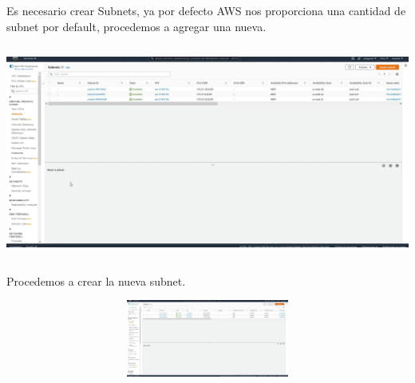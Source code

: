 \documentclass{article} %
\begin{document}
\noindent 

\noindent 

\noindent 

\noindent Es necesario crear Subnets, ya por defecto AWS nos proporciona una cantidad de subnet por default, procedemos a agregar una nueva. 

\noindent 

\noindent \includegraphics*[width=6.43in, height=2.78in, trim=0.02in 0.16in 0.08in 0.13in]{image4}

\noindent 

\noindent 

\noindent 

\noindent 

\noindent 

\noindent 

\noindent 

\noindent Procedemos a crear la nueva subnet. 

\noindent 

\noindent 

\noindent \includegraphics*[width=6.66in, height=1.00in, trim=0.00in 2.05in 0.00in 0.11in]{image5}

\noindent 

\noindent 

\noindent 

\noindent 

\noindent 

\noindent 

\noindent 

\noindent 
\end{document}
